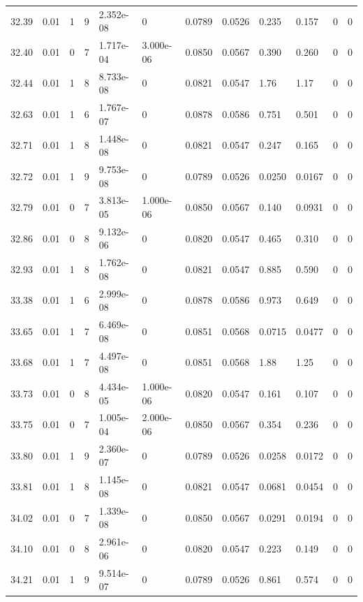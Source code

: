 \documentclass[preview]{standalone}
\begin{document}
{{{{{{{{{\begin{tabular}{L{1.2cm}C{1.2cm} C{0.3cm}C{0.5cm} C{1.4cm}C{1.4cm} C{1.4cm}C{1.4cm} C{1.6cm}C{1.6cm} C{1.6cm}C{1.6cm}}
  32.39  &  0.01  & 1     &  9 &  2.352e-08  & 0  &  0.0789&   0.0526& 0.235 & 0.157   &  0 & 0  \\ 
  32.40  &  0.01  & 0     &  7 &  1.717e-04  & 3.000e-06  &  0.0850&   0.0567& 0.390 & 0.260   &  0 & 0  \\ 
  32.44  &  0.01  & 1     &  8 &  8.733e-08  & 0  &  0.0821&   0.0547& 1.76 & 1.17   &  0 & 0  \\ 
  32.63  &  0.01  & 1     &  6 &  1.767e-07  & 0  &  0.0878&   0.0586& 0.751 & 0.501   &  0 & 0  \\ 
  32.71  &  0.01  & 1     &  8 &  1.448e-08  & 0  &  0.0821&   0.0547& 0.247 & 0.165   &  0 & 0  \\ 
  32.72  &  0.01  & 1     &  9 &  9.753e-08  & 0  &  0.0789&   0.0526& 0.0250 & 0.0167   &  0 & 0  \\ 
  32.79  &  0.01  & 0     &  7 &  3.813e-05  & 1.000e-06  &  0.0850&   0.0567& 0.140 & 0.0931   &  0 & 0  \\ 
  32.86  &  0.01  & 0     &  8 &  9.132e-06  & 0  &  0.0820&   0.0547& 0.465 & 0.310   &  0 & 0  \\ 
  32.93  &  0.01  & 1     &  8 &  1.762e-08  & 0  &  0.0821&   0.0547& 0.885 & 0.590   &  0 & 0  \\ 
  33.38  &  0.01  & 1     &  6 &  2.999e-08  & 0  &  0.0878&   0.0586& 0.973 & 0.649   &  0 & 0  \\ 
  33.65  &  0.01  & 1     &  7 &  6.469e-08  & 0  &  0.0851&   0.0568& 0.0715 & 0.0477   &  0 & 0  \\ 
  33.68  &  0.01  & 1     &  7 &  4.497e-08  & 0  &  0.0851&   0.0568& 1.88 & 1.25   &  0 & 0  \\ 
  33.73  &  0.01  & 0     &  8 &  4.434e-05  & 1.000e-06  &  0.0820&   0.0547& 0.161 & 0.107   &  0 & 0  \\ 
  33.75  &  0.01  & 0     &  7 &  1.005e-04  & 2.000e-06  &  0.0850&   0.0567& 0.354 & 0.236   &  0 & 0  \\ 
  33.80  &  0.01  & 1     &  9 &  2.360e-07  & 0  &  0.0789&   0.0526& 0.0258 & 0.0172   &  0 & 0  \\ 
  33.81  &  0.01  & 1     &  8 &  1.145e-08  & 0  &  0.0821&   0.0547& 0.0681 & 0.0454   &  0 & 0  \\ 
  34.02  &  0.01  & 0     &  7 &  1.339e-08  & 0  &  0.0850&   0.0567& 0.0291 & 0.0194   &  0 & 0  \\ 
  34.10  &  0.01  & 0     &  8 &  2.961e-06  & 0  &  0.0820&   0.0547& 0.223 & 0.149   &  0 & 0  \\ 
  34.21  &  0.01  & 1     &  9 &  9.514e-07  & 0  &  0.0789&   0.0526& 0.861 & 0.574   &  0 & 0  \\ 

\end{tabular}}}}}}}}}}
\end{document}
